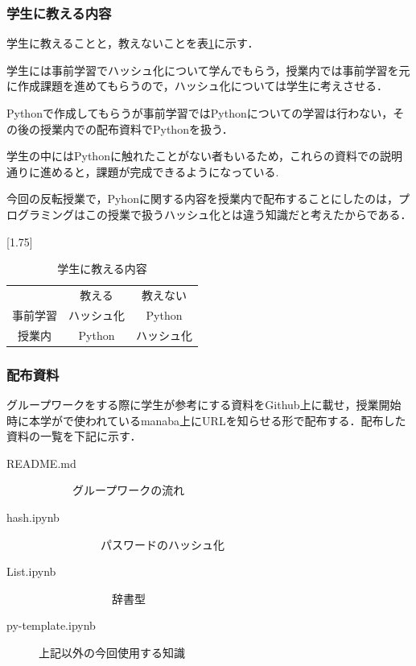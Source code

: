 \documentclass[a4j,11pt]{jsarticle}
\begin{document}
\newpage

\subsubsection{学生に教える内容}

学生に教えることと，教えないことを表\ref{osi}に示す．

学生には事前学習でハッシュ化について学んでもらう，授業内では事前学習を元に作成課題を進めてもらうので，ハッシュ化については学生に考えさせる．

Pythonで作成してもらうが事前学習ではPythonについての学習は行わない，その後の授業内での配布資料でPythonを扱う．

学生の中にはPythonに触れたことがない者もいるため，これらの資料での説明通りに進めると，課題が完成できるようになっている.

今回の反転授業で，Pyhonに関する内容を授業内で配布することにしたのは，プログラミングはこの授業で扱うハッシュ化とは違う知識だと考えたからである．

\begin{table}[htbp]
\begin{center}
\caption{学生に教える内容}
\scalebox{1.75}[1.75]{
\begin{tabular}{|c|c|c|}
\cline{1-3}
 {} & 教える&教えない \\ \cline{1-3}  
事前学習 & ハッシュ化 &Python \\ \cline{1-3}  
 授業内 & Python &ハッシュ化\\ \cline{1-3}  
\end{tabular}
}
\label{osi}
\end{center}
\end{table}

\newpage 

\subsubsection{配布資料}
グループワークをする際に学生が参考にする資料をGithub上に載せ，授業開始時に本学がで使われているmanaba上にURLを知らせる形で配布する．配布した資料の一覧を下記に示す．

\begin{description}

 \item[README.md]   \ \ \ \ \ \      グループワークの流れ
  \item[hash.ipynb]\ \ \ \ \ \ \ \ \ \ \ パスワードのハッシュ化
  \item[List.ipynb]\ \ \ \ \ \ \ \ \ \ \ \ \  辞書型
  \item[py-template.ipynb]上記以外の今回使用する知識
  
\end{description}
\end{document}
